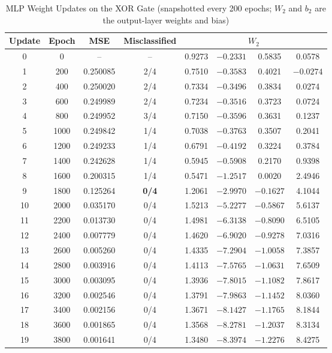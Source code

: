 \documentclass[11pt]{article}
\begin{document}
\begin{table}[H]
\centering
\small
\caption{MLP Weight Updates on the XOR Gate (snapshotted every 200 epochs; $W_2$ and $b_2$ are the output-layer weights and bias)}
\begin{tabular}{@{}cccccccc@{}}
\toprule
\textbf{Update} & \textbf{Epoch} & \textbf{MSE} & \textbf{Misclassified} & \multicolumn{4}{c}{\textbf{$W_2$}} \\
\midrule
0  & 0    & --       & --  & 0.9273 & $-0.2331$ & 0.5835  & 0.0578 \\
1  & 200  & 0.250085 & 2/4 & 0.7510 & $-0.3583$ & 0.4021  & $-0.0274$ \\
2  & 400  & 0.250020 & 2/4 & 0.7334 & $-0.3496$ & 0.3834  & 0.0274 \\
3  & 600  & 0.249989 & 2/4 & 0.7234 & $-0.3516$ & 0.3723  & 0.0724 \\
4  & 800  & 0.249952 & 3/4 & 0.7150 & $-0.3596$ & 0.3631  & 0.1237 \\
5  & 1000 & 0.249842 & 1/4 & 0.7038 & $-0.3763$ & 0.3507  & 0.2041 \\
6  & 1200 & 0.249233 & 1/4 & 0.6791 & $-0.4192$ & 0.3224  & 0.3784 \\
7  & 1400 & 0.242628 & 1/4 & 0.5945 & $-0.5908$ & 0.2170  & 0.9398 \\
8  & 1600 & 0.200315 & 1/4 & 0.5471 & $-1.2517$ & 0.0020  & 2.4946 \\
9  & 1800 & 0.125264 & \textbf{0/4} & 1.2061 & $-2.9970$ & $-0.1627$ & 4.1044 \\
10 & 2000 & 0.035170 & 0/4 & 1.5213 & $-5.2277$ & $-0.5867$ & 5.6137 \\
11 & 2200 & 0.013730 & 0/4 & 1.4981 & $-6.3138$ & $-0.8090$ & 6.5105 \\
12 & 2400 & 0.007779 & 0/4 & 1.4620 & $-6.9020$ & $-0.9278$ & 7.0316 \\
13 & 2600 & 0.005260 & 0/4 & 1.4335 & $-7.2904$ & $-1.0058$ & 7.3857 \\
14 & 2800 & 0.003916 & 0/4 & 1.4113 & $-7.5765$ & $-1.0631$ & 7.6509 \\
15 & 3000 & 0.003095 & 0/4 & 1.3936 & $-7.8015$ & $-1.1082$ & 7.8617 \\
16 & 3200 & 0.002546 & 0/4 & 1.3791 & $-7.9863$ & $-1.1452$ & 8.0360 \\
17 & 3400 & 0.002156 & 0/4 & 1.3671 & $-8.1427$ & $-1.1765$ & 8.1844 \\
18 & 3600 & 0.001865 & 0/4 & 1.3568 & $-8.2781$ & $-1.2037$ & 8.3134 \\
19 & 3800 & 0.001641 & 0/4 & 1.3480 & $-8.3974$ & $-1.2276$ & 8.4275 \\

\end{tabular}
\end{table}
\end{document}
